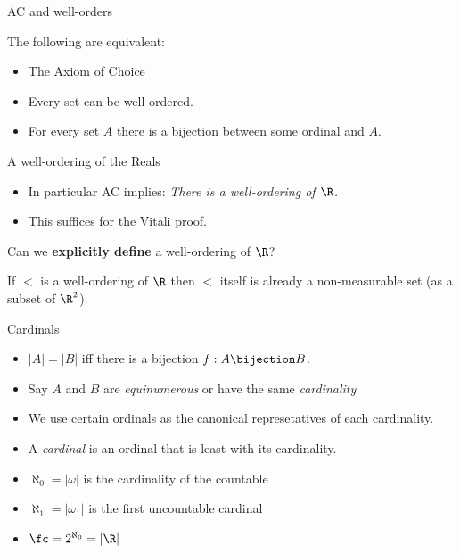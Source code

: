\begin{frame}{AC and well-orders}

The following are equivalent:
\begin{itemize}
  \item  The Axiom of Choice
  \item  Every set can be well-ordered.
  \item For every set $A$ there is a bijection between some ordinal and $A$.
\end{itemize}

\end{frame}

\begin{frame}{A well-ordering of the Reals}

\begin{itemize}
  \item  In particular AC implies: \emph{There is a well-ordering of $\R$.}
  \item  This suffices for the Vitali proof.
\end{itemize}

\begin{question}
Can we \textbf{explicitly define} a well-ordering of $\R$?
\end{question}

\begin{fact}
If $<$ is a well-ordering of $\R$ then $<$ itself is
already a non-measurable set (as a subset of $\R^2$).
\end{fact}

\end{frame}

\begin{frame}{Cardinals}

\begin{definition}
\begin{itemize}
  \item $|A| = |B|$ iff there is a bijection $f:A\bijection B$.
  \item Say $A$ and $B$ are \emph{equinumerous} or have the same \emph{cardinality}
  \item We use certain ordinals as the canonical represetatives of each cardinality.
  \item A \emph{cardinal} is an ordinal that is least with its cardinality.
  \item  $\aleph_0 = |\omega|$ is the cardinality of the countable
  \item  $\aleph_1 = |\omega_1|$ is the first uncountable cardinal
  \item $\fc  = 2^{\aleph_0} = |\R|$
\end{itemize}
\end{definition}

\end{frame}

